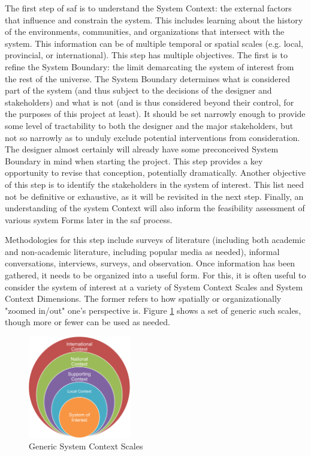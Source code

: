 The first step of \ac{saf} is to understand the System Context: the external factors that influence and constrain the system. This includes learning about the history of the environments, communities, and organizations that intersect with the system. This information can be of multiple temporal or spatial scales (e.g. local, provincial, or international). This step has multiple objectives. The first is to refine the System Boundary: the limit demarcating the system of interest from the rest of the universe. The System Boundary determines what is considered part of the system (and thus subject to the decisions of the designer and stakeholders) and what is not (and is thus considered beyond their control, for the purposes of this project at least). It should be set narrowly enough to provide some level of tractability to both the designer and the major stakeholders, but not so narrowly as to unduly exclude potential interventions from consideration. The designer almost certainly will already have some preconceived System Boundary in mind when starting the project. This step provides a key opportunity to revise that conception, potentially dramatically. Another objective of this step is to identify the stakeholders in the system of interest. This list need not be definitive or exhaustive, as it will be revisited in the next step. Finally, an understanding of the system Context will also inform the feasibility assessment of various system Forms later in the \ac{saf} process.

Methodologies for this step include surveys of literature (including both academic and non-academic literature, including popular media as needed), informal conversations, interviews, surveys, and observation. Once information has been gathered, it needs to be organized into a useful form. For this, it is often useful to consider the system of interest at a variety of System Context Scales and System Context Dimensions. The former refers to how spatially or organizationally "zoomed in/out" one's perspective is. Figure \ref{fig:scale} shows a set of generic such scales, though more or fewer can be used as needed. 

\begin{figure}[!htb] 
\centering
\includegraphics[width=0.4\textwidth]{Figures/chap3/scale.png}
\caption[Generic System Context Scales]{Generic System Context Scales}
\label{fig:scale}
\end{figure}

